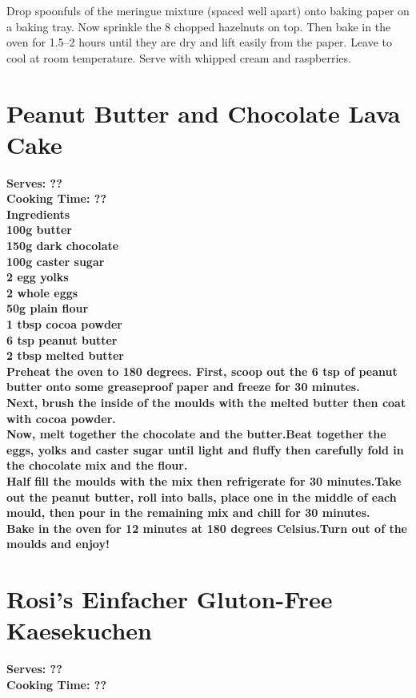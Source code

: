 \documentclass[18pt, oneside]{book}
\begin{document}
Drop spoonfuls of the meringue mixture (spaced well apart) onto baking paper on a baking tray. Now sprinkle the 8 chopped hazelnuts on top. Then bake in the oven for 1.5--2 hours until they are dry and lift easily from the paper. Leave to cool at room temperature. Serve with whipped cream and raspberries. 

\section{Peanut Butter and Chocolate Lava Cake}
\bf{Serves: ??} \\
\bf{Cooking Time: ??} \\

\bf{Ingredients} \normalfont \\
100g butter\\
150g dark chocolate \\
100g caster sugar \\
2 egg yolks \\
2 whole eggs \\
50g plain flour \\
1 tbsp cocoa powder \\
6 tsp peanut butter \\
2 tbsp melted butter \\

Preheat the oven to 180 degrees. First, scoop out the 6 tsp of peanut butter onto some greaseproof paper and freeze for 30 minutes. \\

Next, brush the inside of the moulds with the melted butter then coat with cocoa powder. \\

Now, melt together the chocolate and the butter.Beat together the eggs, yolks and caster sugar until light and fluffy then carefully fold in the chocolate mix and the flour. \\

Half fill the moulds with the mix then refrigerate for 30 minutes.Take out the peanut butter, roll into balls, place one in the middle of each mould, then pour in the remaining mix and chill for 30 minutes. \\

Bake in the oven for 12 minutes at 180 degrees Celsius.Turn out of the moulds and enjoy! \\ 



\section{Rosi's Einfacher Gluton-Free Kaesekuchen}
\bf{Serves: ??} \\
\bf{Cooking Time: ??} \\
\end{document}

